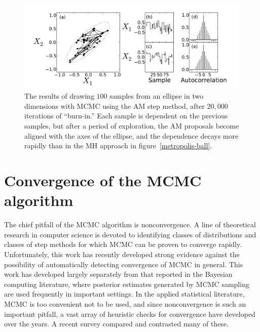 \begin{figure}[ht]
\begin{center}
\includegraphics[width=\textwidth]{am-ball-2.pdf}
\caption[The results of drawing $100$ samples from an ellipse in two
  dimensions with MCMC using the AM step method, after $20,000$
  iterations of ``burn-in.'']{The results of drawing $100$ samples 
  from an ellipse in two
  dimensions with MCMC using the AM step method, after $20,000$
  iterations of ``burn-in.''  Each sample is dependent on the previous
  samples, but after a period of exploration, the AM proposals become
  aligned with the axes of the ellipse, and the dependence decays more
  rapidly than in the MH approach in figure~\ref{metropolis-ball}.}
\label{am-ball}
\end{center}
\end{figure}

\section{Convergence of the MCMC algorithm}

The chief pitfall of the MCMC algorithm is nonconvergence.  A line of
theoretical research in computer science is devoted to identifying
classes of distributions and classes of step methods for which MCMC
can be proven to converge
rapidly.\cite{dyer_random_1991,bubley_path_1997,
  dyer_markov_2000,geyer_introduction_2010} Unfortunately, this work
has recently developed strong evidence against the possibility of
automatically detecting convergence of MCMC in
general.\cite{bhatnagar_computational_2011} This work has developed
largely separately from that reported in the Bayesian computing literature, where
posterior estimates generated by MCMC sampling are used frequently in
important
settings.\cite{gilks_markov_1996,jon_wakefield_bayesian_1996,gelman_bayesian_2003}
In the applied statistical literature, MCMC is too convenient not to
be used, and since nonconvergence is such an important pitfall, a vast
array of heuristic checks for convergence have developed over the
years. A recent survey compared and contrasted many of
these.\cite{mengersen_mcmc_1999}

